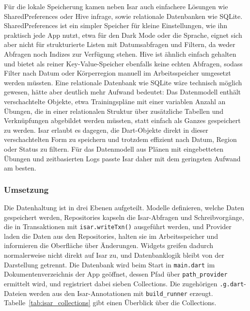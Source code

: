 Für die lokale Speicherung kamen neben Isar auch einfachere Lösungen wie SharedPreferences oder Hive infrage, sowie relationale Datenbanken wie SQLite. SharedPreferences ist ein simpler Speicher für kleine Einstellungen, wie ihn praktisch jede App nutzt, etwa für den Dark Mode oder die Sprache, eignet sich aber nicht für strukturierte Listen mit Datumsabfragen und Filtern, da weder Abfragen noch Indizes zur Verfügung stehen. Hive ist ähnlich einfach gehalten und bietet als reiner Key-Value-Speicher ebenfalls keine echten Abfragen, sodass Filter nach Datum oder Körperregion manuell im Arbeitsspeicher umgesetzt werden müssten. Eine relationale Datenbank wie SQLite wäre technisch möglich gewesen, hätte aber deutlich mehr Aufwand bedeutet: Das Datenmodell enthält verschachtelte Objekte, etwa Trainingspläne mit einer variablen Anzahl an Übungen, die in einer relationalen Struktur über zusätzliche Tabellen und Verknüpfungen abgebildet werden müssten, statt einfach als Ganzes gespeichert zu werden. Isar erlaubt es dagegen, die Dart-Objekte direkt in dieser verschachtelten Form zu speichern und trotzdem effizient nach Datum, Region oder Status zu filtern. Für das Datenmodell aus Plänen mit eingebetteten Übungen und zeitbasierten Logs passte Isar daher mit dem geringsten Aufwand am besten.

\subsubsection{Umsetzung}
\label{sec:api-isar-umsetzung}

Die Datenhaltung ist in drei Ebenen aufgeteilt. Modelle definieren, welche Daten gespeichert werden, Repositories kapseln die Isar-Abfragen und Schreibvorgänge, die in Transaktionen mit \texttt{isar.writeTxn()} ausgeführt werden, und Provider laden die Daten aus den Repositories, halten sie im Arbeitsspeicher und informieren die Oberfläche über Änderungen. Widgets greifen dadurch normalerweise nicht direkt auf Isar zu, und Datenbanklogik bleibt von der Darstellung getrennt. Die Datenbank wird beim Start in \texttt{main.dart} im Dokumentenverzeichnis der App geöffnet, dessen Pfad über \texttt{path\_provider} ermittelt wird, und registriert dabei sieben Collections. Die zugehörigen \texttt{.g.dart}-Dateien werden aus den Isar-Annotationen mit \texttt{build\_runner} erzeugt. Tabelle~\ref{tab:isar_collections} gibt einen Überblick über die Collections.

